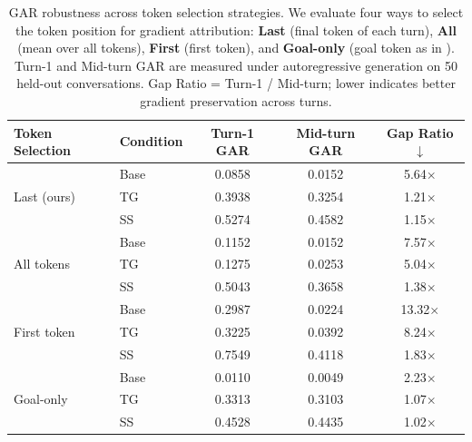 \begin{table}[t]
\centering
\small
\caption{GAR robustness across token selection strategies. We evaluate four ways to select the token position for gradient attribution: \textbf{Last} (final token of each turn), \textbf{All} (mean over all tokens), \textbf{First} (first token), and \textbf{Goal-only} (goal token as in \citet{dongre2026attention}). Turn-1 and Mid-turn GAR are measured under autoregressive generation on 50 held-out conversations. Gap Ratio = Turn-1 / Mid-turn; lower indicates better gradient preservation across turns.}
\label{tab:gar_robustness}
\begin{tabular}{@{}ll ccc@{}}
\toprule
\textbf{Token Selection} & \textbf{Condition} & \textbf{Turn-1 GAR} & \textbf{Mid-turn GAR} & \textbf{Gap Ratio} $\downarrow$ \\
\midrule
\multirow{3}{*}{Last (ours)}
  & Base      & 0.0858 & 0.0152 & 5.64$\times$ \\
  & TG        & 0.3938 & 0.3254 & 1.21$\times$ \\
  & SS        & 0.5274 & 0.4582 & 1.15$\times$ \\
\midrule
\multirow{3}{*}{All tokens}
  & Base      & 0.1152 & 0.0152 & 7.57$\times$ \\
  & TG        & 0.1275 & 0.0253 & 5.04$\times$ \\
  & SS        & 0.5043 & 0.3658 & 1.38$\times$ \\
\midrule
\multirow{3}{*}{First token}
  & Base      & 0.2987 & 0.0224 & 13.32$\times$ \\
  & TG        & 0.3225 & 0.0392 & 8.24$\times$ \\
  & SS        & 0.7549 & 0.4118 & 1.83$\times$ \\
\midrule
\multirow{3}{*}{Goal-only}
  & Base      & 0.0110 & 0.0049 & 2.23$\times$ \\
  & TG        & 0.3313 & 0.3103 & 1.07$\times$ \\
  & SS        & 0.4528 & 0.4435 & 1.02$\times$ \\
\bottomrule
\end{tabular}
\end{table}

